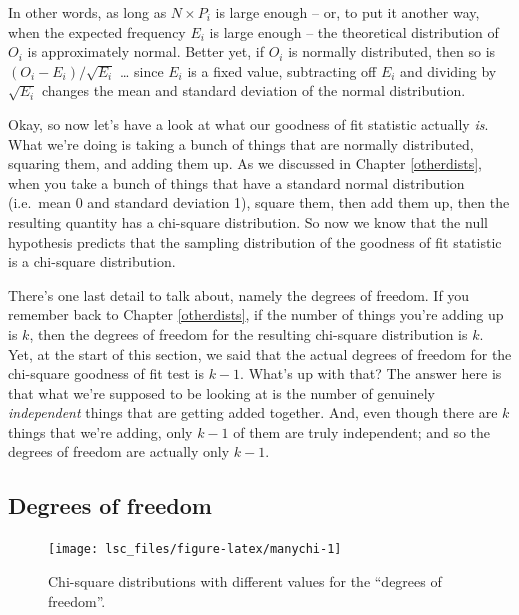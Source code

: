 \documentclass[
  11pt,
  a4paper,
  twoside,symmetric,openright]{book}
\theoremstyle{break}
\theoremstyle{break}
\begin{document}
In other words, as long as \(N \times P_i\) is large enough -- or, to put it another way, when the expected frequency \(E_i\) is large enough -- the theoretical distribution of \(O_i\) is approximately normal. Better yet, if \(O_i\) is normally distributed, then so is \((O_i - E_i)/\sqrt{E_i}\) \ldots{} since \(E_i\) is a fixed value, subtracting off \(E_i\) and dividing by \(\sqrt{E_i}\) changes the mean and standard deviation of the normal distribution.

Okay, so now let's have a look at what our goodness of fit statistic actually \emph{is}. What we're doing is taking a bunch of things that are normally distributed, squaring them, and adding them up. As we discussed in Chapter \ref{otherdists}, when you take a bunch of things that have a standard normal distribution (i.e.~mean 0 and standard deviation 1), square them, then add them up, then the resulting quantity has a chi-square distribution. So now we know that the null hypothesis predicts that the sampling distribution of the goodness of fit statistic is a chi-square distribution.

There's one last detail to talk about, namely the degrees of freedom. If you remember back to Chapter \ref{otherdists}, if the number of things you're adding up is \(k\), then the degrees of freedom for the resulting chi-square distribution is \(k\). Yet, at the start of this section, we said that the actual degrees of freedom for the chi-square goodness of fit test is \(k-1\). What's up with that? The answer here is that what we're supposed to be looking at is the number of genuinely \emph{independent} things that are getting added together. And, even though there are \(k\) things that we're adding, only \(k-1\) of them are truly independent; and so the degrees of freedom are actually only \(k-1\).

\subsection{Degrees of freedom}\label{degrees-of-freedom}



\begin{figure}

{\centering \texttt{[image: lsc\_files/figure-latex/manychi-1]} 

}

\caption{Chi-square distributions with different values for the ``degrees of freedom''.}\label{fig:manychi}
\end{figure}
\end{document}
